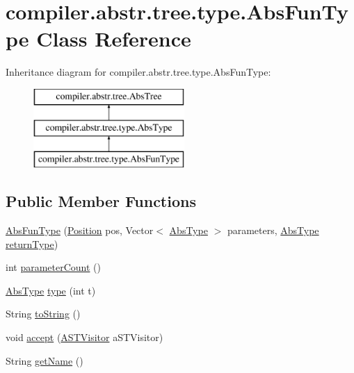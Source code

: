 \hypertarget{classcompiler_1_1abstr_1_1tree_1_1type_1_1_abs_fun_type}{}\section{compiler.\+abstr.\+tree.\+type.\+Abs\+Fun\+Type Class Reference}
\label{classcompiler_1_1abstr_1_1tree_1_1type_1_1_abs_fun_type}
Inheritance diagram for compiler.\+abstr.\+tree.\+type.\+Abs\+Fun\+Type\+:\begin{figure}[H]
\begin{center}
\leavevmode
\includegraphics[height=3.000000cm]{classcompiler_1_1abstr_1_1tree_1_1type_1_1_abs_fun_type}
\end{center}
\end{figure}
\subsection*{Public Member Functions}
\begin{DoxyCompactItemize}
\item 
\hyperlink{classcompiler_1_1abstr_1_1tree_1_1type_1_1_abs_fun_type_a4a44395a53d25662cb90998726e8a550}{Abs\+Fun\+Type} (\hyperlink{classcompiler_1_1_position}{Position} pos, Vector$<$ \hyperlink{classcompiler_1_1abstr_1_1tree_1_1type_1_1_abs_type}{Abs\+Type} $>$ parameters, \hyperlink{classcompiler_1_1abstr_1_1tree_1_1type_1_1_abs_type}{Abs\+Type} \hyperlink{classcompiler_1_1abstr_1_1tree_1_1type_1_1_abs_fun_type_aa73fe24d3914b149edf99b33bfe8b9f8}{return\+Type})
\item 
int \hyperlink{classcompiler_1_1abstr_1_1tree_1_1type_1_1_abs_fun_type_ae8a9e52a0d2d3d675e9b0b663d183be2}{parameter\+Count} ()
\item 
\hyperlink{classcompiler_1_1abstr_1_1tree_1_1type_1_1_abs_type}{Abs\+Type} \hyperlink{classcompiler_1_1abstr_1_1tree_1_1type_1_1_abs_fun_type_a242d8643946428b2ed20fda9889f9365}{type} (int t)
\item 
String \hyperlink{classcompiler_1_1abstr_1_1tree_1_1type_1_1_abs_fun_type_a2142a9f6f96ff148dd06fee4061b53e9}{to\+String} ()
\item 
void \hyperlink{classcompiler_1_1abstr_1_1tree_1_1type_1_1_abs_fun_type_a647c145b44970338d49cd77a5b5b8ca1}{accept} (\hyperlink{interfacecompiler_1_1abstr_1_1_a_s_t_visitor}{A\+S\+T\+Visitor} a\+S\+T\+Visitor)
\item 
String \hyperlink{classcompiler_1_1abstr_1_1tree_1_1type_1_1_abs_fun_type_a1b2f887e9ec0f9943444c5e52c7d1143}{get\+Name} ()
\end{DoxyCompactItemize}
